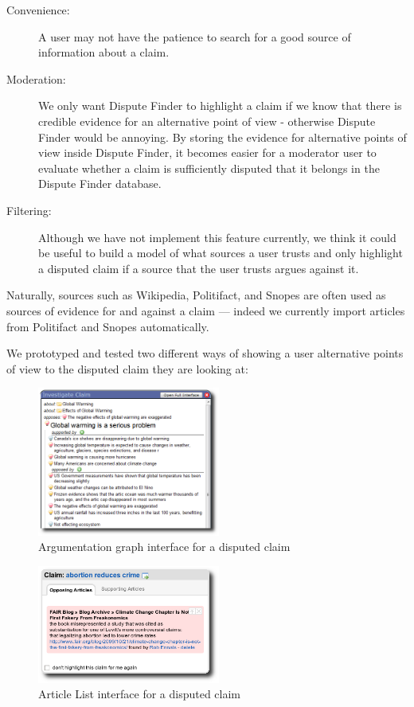 \documentclass{www2010-submission}
\begin{document}
\begin{description}
\item[Convenience:] A user may not have the patience to search for a good source of information about a claim. 
\item[Moderation:] We only want Dispute Finder to highlight a claim if we know that there is credible evidence for an alternative point of view - otherwise Dispute Finder would be annoying. By storing the evidence for alternative points of view inside Dispute Finder, it becomes easier for a moderator user to evaluate whether a claim is sufficiently disputed that it belongs in the Dispute Finder database.
\item[Filtering:] Although we have not implement this feature currently, we think it could be useful to build a model of what sources a user trusts and only highlight a disputed claim if a source that the user trusts argues against it.
\end{description}

Naturally, sources such as Wikipedia, Politifact, and Snopes are often used as sources of evidence for and against a claim --- indeed we currently import articles from Politifact and Snopes automatically.

We prototyped and tested two different ways of showing a user alternative points of view to the disputed claim they are looking at:

\begin{figure}[tb]
	\begin{center}
	\includegraphics[width=6cm]{pictures/popup_graph_crop.png}
	\caption{Argumentation graph interface for a disputed claim}
	\label{popup_graph}
	\end{center}
\end{figure}

\begin{figure}[tb]
	\begin{center}
	\includegraphics[width=6cm]{pictures/popup_abortion_shadow.png}
	\caption{Article List interface for a disputed claim}
	\label{article_list}
	\end{center}
\end{figure}
\end{document}
